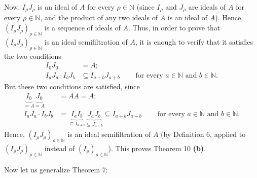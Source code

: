 \documentclass[12pt,final,notitlepage,onecolumn]{article}%
\begin{document}
Now, $I_{\rho}J_{\rho}$ is an ideal of $A$ for every $\rho\in\mathbb{N}$
(since $I_{\rho}$ and $J_{\rho}$ are ideals of $A$ for every $\rho
\in\mathbb{N}$, and the product of any two ideals of $A$ is an ideal of $A$).
Hence, $\left(  I_{\rho}J_{\rho}\right)  _{\rho\in\mathbb{N}}$ is a sequence
of ideals of $A$. Thus, in order to prove that $\left(  I_{\rho}J_{\rho
}\right)  _{\rho\in\mathbb{N}}$ is an ideal semifiltration of $A$, it is
enough to verify that it satisfies the two conditions%
\begin{align*}
I_{0}J_{0}  &  =A;\\
I_{a}J_{a}\cdot I_{b}J_{b}  &  \subseteq I_{a+b}J_{a+b}%
\ \ \ \ \ \ \ \ \ \ \text{for every }a\in\mathbb{N}\text{ and }b\in\mathbb{N}.
\end{align*}
But these two conditions are satisfied, since%
\begin{align*}
\underbrace{I_{0}}_{=A}\underbrace{J_{0}}_{=A}  &  =AA=A;\\
I_{a}J_{a}\cdot I_{b}J_{b}  &  =\underbrace{I_{a}I_{b}}_{\subseteq I_{a+b}%
}\underbrace{J_{a}J_{b}}_{\subseteq J_{a+b}}\subseteq I_{a+b}J_{a+b}%
\ \ \ \ \ \ \ \ \ \ \text{for every }a\in\mathbb{N}\text{ and }b\in\mathbb{N}.
\end{align*}
Hence, $\left(  I_{\rho}J_{\rho}\right)  _{\rho\in\mathbb{N}}$ is an ideal
semifiltration of $A$ (by Definition 6, applied to $\left(  I_{\rho}J_{\rho
}\right)  _{\rho\in\mathbb{N}}$ instead of $\left(  I_{\rho}\right)  _{\rho
\in\mathbb{N}}$). This proves Theorem 10 \textbf{(b)}.

Now let us generalize Theorem 7:
\end{document}
